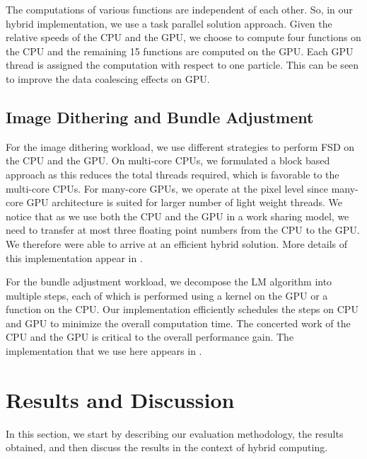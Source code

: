 \documentclass[11pt]{article}
\begin{document}
The computations of various functions are independent of each other. So, 
in our hybrid implementation, we use a task parallel solution approach.
Given the relative speeds of the CPU and the GPU, 
we choose to compute four functions on the CPU and the 
remaining 15 functions are computed on the GPU. Each GPU thread is assigned
the computation with respect to one particle. This can be seen to improve the
data coalescing effects on GPU. 


\subsection{Image Dithering and Bundle Adjustment}
For the image dithering workload, we use different strategies to 
perform FSD on  the CPU  and the GPU. On multi-core CPUs, we
formulated a block based approach as this reduces the total threads
required, which is favorable to the multi-core CPUs. For many-core GPUs,
we operate at the pixel level since many-core GPU architecture is suited
for larger number of light weight threads. We notice that  as we use both
the CPU and the GPU in a work sharing model, we need to transfer at most 
three floating point numbers from the CPU to the GPU. We therefore were
able to arrive at an efficient hybrid solution. More details of this
implementation appear in \cite{hipc11pjn}.

For the bundle adjustment workload, we decompose the LM algorithm into multiple
steps, each of which is performed using a kernel on the GPU or a function on
the CPU. Our implementation efficiently schedules the steps on CPU and GPU
to minimize the overall computation time. The concerted work of the CPU and
the GPU is critical to the overall performance gain. 
The implementation that we use here appears in \cite{bundle}.



\section{Results and Discussion}
\label{sec:results}

In this section, we start by describing our evaluation methodology, the
results obtained, and then discuss the results in the context of hybrid
computing.
\end{document}
